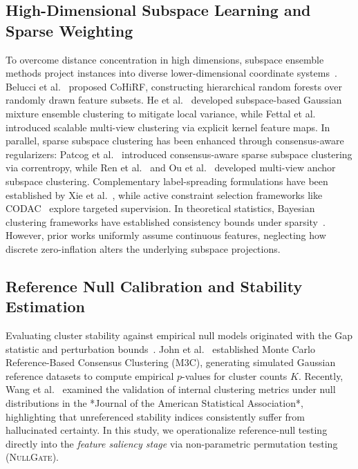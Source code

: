 \documentclass[preprint,12pt]{elsarticle}
\begin{document}
\subsection{High-Dimensional Subspace Learning and Sparse Weighting}
To overcome distance concentration in high dimensions, subspace ensemble methods project instances into diverse lower-dimensional coordinate systems~\cite{fern2003random}. Belucci et al.~\cite{belucci2025cohirf} proposed CoHiRF, constructing hierarchical random forests over randomly drawn feature subsets. He et al.~\cite{he2025subspace} developed subspace-based Gaussian mixture ensemble clustering to mitigate local variance, while Fettal et al.~\cite{fettal2026scalable} introduced scalable multi-view clustering via explicit kernel feature maps. In parallel, sparse subspace clustering has been enhanced through consensus-aware regularizers: Patcog et al.~\cite{patcog2026consensus} introduced consensus-aware sparse subspace clustering via correntropy, while Ren et al.~\cite{ren2026multiview} and Ou et al.~\cite{ou2024anchor} developed multi-view anchor subspace clustering. Complementary label-spreading formulations have been established by Xie et al.~\cite{xie2025efficient}, while active constraint selection frameworks like CODAC~\cite{patron2026codac} explore targeted supervision. In theoretical statistics, Bayesian clustering frameworks have established consistency bounds under sparsity~\cite{biometrika2024bayesian,chen2026data}. However, prior works uniformly assume continuous features, neglecting how discrete zero-inflation alters the underlying subspace projections.

\subsection{Reference Null Calibration and Stability Estimation}
Evaluating cluster stability against empirical null models originated with the Gap statistic and perturbation bounds~\cite{john2020m3c,wang2026deep_jasa}. John et al.~\cite{john2020m3c} established Monte Carlo Reference-Based Consensus Clustering (M3C), generating simulated Gaussian reference datasets to compute empirical $p$-values for cluster counts $K$. Recently, Wang et al.~\cite{wang2026deep_jasa} examined the validation of internal clustering metrics under null distributions in the *Journal of the American Statistical Association*, highlighting that unreferenced stability indices consistently suffer from hallucinated certainty. In this study, we operationalize reference-null testing directly into the \textit{feature saliency stage} via non-parametric permutation testing (\textsc{NullGate}).
\end{document}
